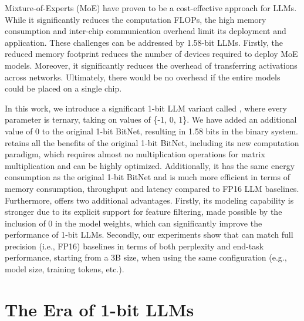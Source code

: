 Mixture-of-Experts (MoE) have proven to be a cost-effective approach for LLMs. While it significantly reduces the computation FLOPs, the high memory consumption and inter-chip communication overhead limit its deployment and application. These challenges can be addressed by 1.58-bit LLMs. Firstly, the reduced memory footprint reduces the number of devices required to deploy MoE models. Moreover, it significantly reduces the overhead of transferring activations across networks. Ultimately, there would be no overhead if the entire models could be placed on a single chip.

In this work, we introduce a significant 1-bit LLM variant called \textbf{}, where every parameter is ternary, taking on values of \{-1, 0, 1\}. We have added an additional value of 0 to the original 1-bit BitNet, resulting in 1.58 bits in the binary system.  retains all the benefits of the original 1-bit BitNet, including its new computation paradigm, which requires almost no multiplication operations for matrix multiplication and can be highly optimized. Additionally, it has the same energy consumption as the original 1-bit BitNet and is much more efficient in terms of memory consumption, throughput and latency compared to FP16 LLM baselines. Furthermore,  offers two additional advantages. Firstly, its modeling capability is stronger due to its explicit support for feature filtering, made possible by the inclusion of 0 in the model weights, which can significantly improve the performance of 1-bit LLMs. Secondly, our experiments show that  can match full precision (i.e., FP16) baselines in terms of both perplexity and end-task performance, starting from a 3B size, when using the same configuration (e.g., model size, training tokens, etc.).

\section{The Era of 1-bit LLMs}


\begin{abstract}
Recent research, such as BitNet~\cite{bitnet}, is paving the way for a new era of 1-bit Large Language Models (LLMs). In this work, we introduce a 1-bit LLM variant, namely \textbf{}, in which every single parameter (or weight) of the LLM is ternary \{-1, 0, 1\}. It matches the full-precision (i.e., FP16 or BF16) Transformer LLM with the same model size and training tokens in terms of both perplexity and end-task performance, while being significantly more cost-effective in terms of latency, memory, throughput, and energy consumption. More profoundly, the 1.58-bit LLM defines a new scaling law and recipe for training new generations of LLMs that are both high-performance and cost-effective. Furthermore, it enables a new computation paradigm and opens the door for designing specific hardware optimized for 1-bit LLMs.
\end{abstract}

